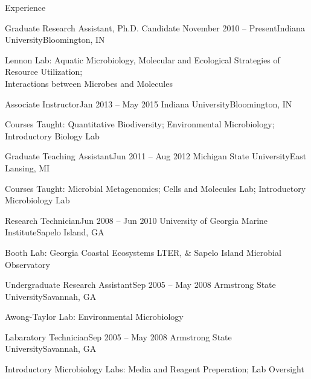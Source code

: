 \documentclass{resume} %
\begin{document}
\begin{rSection}{Experience}

  \begin{rSubsection}{Graduate Research Assistant, Ph.D. Candidate}
    {November 2010 -- Present}{Indiana University}{Bloomington, IN}
    \item Lennon Lab: Aquatic Microbiology, Molecular and Ecological Strategies
                      of Resource Utilization; \\
                      Interactions between Microbes and Molecules
  \end{rSubsection}

  \begin{rSubsection}{Associate Instructor}{Jan 2013 -- May 2015}
    {Indiana University}{Bloomington, IN}
    \item Courses Taught: Quantitative Biodiversity; Environmental Microbiology;
                          Introductory Biology Lab
  \end{rSubsection}

  \begin{rSubsection}{Graduate Teaching Assistant}{Jun 2011 -- Aug 2012}
    {Michigan State University}{East Lansing, MI}
    \item Courses Taught: Microbial Metagenomics; Cells and Molecules Lab;
                          Introductory Microbiology Lab
  \end{rSubsection}

  \begin{rSubsection}{Research Technician}{Jun 2008 -- Jun 2010}
    {University of Georgia Marine Institute}{Sapelo Island, GA}
    \item Booth Lab: Georgia Coastal Ecosystems LTER, \& Sapelo Island Microbial
                     Observatory
  \end{rSubsection}

  \begin{rSubsection}{Undergraduate Research Assistant}{Sep 2005 -- May 2008}
    {Armstrong State University}{Savannah, GA}
    \item Awong-Taylor Lab: Environmental Microbiology
  \end{rSubsection}

  \begin{rSubsection}{Labaratory Technician}{Sep 2005 -- May 2008}
    {Armstrong State University}{Savannah, GA}
    \item Introductory Microbiology Labs: Media and Reagent Preperation;
                                          Lab Oversight
  \end{rSubsection}

\end{rSection}
\end{document}
